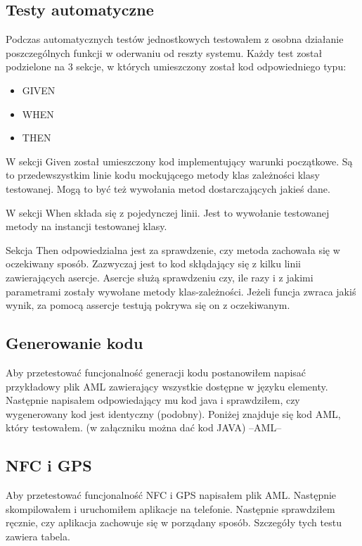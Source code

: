 \documentclass	{xmgr}
\begin{document}
\subsection{Testy automatyczne }
Podczas  automatycznych testów jednostkowych testowałem z osobna działanie poszczególnych funkcji w oderwaniu od reszty systemu. Każdy test został podzielone na 3 sekcje, w których umieszczony został kod odpowiedniego typu:
\begin{itemize}
\item GIVEN
\item WHEN
\item THEN
\end{itemize}

W sekcji Given został umieszczony kod implementujący warunki początkowe. Są to przedewszystkim linie kodu mockującego metody klas zależności klasy testowanej. Mogą to być też wywołania metod dostarczających jakieś dane. 

W sekcji When składa się z pojedynczej linii. Jest to wywołanie testowanej metody na instancji testowanej klasy.

Sekcja Then odpowiedzialna jest za sprawdzenie, czy metoda zachowała się w oczekiwany sposób. Zazwyczaj jest to kod skłądający się z kilku linii zawierających asercje. Asercje służą sprawdzeniu czy, ile razy i z jakimi parametrami zostały wywołane metody klas-zależności. Jeżeli funcja zwraca jakiś wynik, za pomocą assercje testują pokrywa się on z oczekiwanym.

\subsection{Generowanie kodu}
Aby przetestować funcjonalność generacji kodu postanowiłem napisać przykładowy plik AML zawierający wszystkie dostępne w języku elementy. Następnie napisałem odpowiedający mu kod java i sprawdziłem, czy wygenerowany kod jest identyczny (podobny).  
Poniżej znajduje się kod AML, który testowałem. (w załączniku można dać kod JAVA)
--AML--

\subsection{NFC i GPS}
Aby przetestować funcjonalność NFC i GPS napisałem plik AML. Następnie skompilowałem i uruchomiłem aplikacje na telefonie. 
Następnie sprawdziłem ręcznie, czy aplikacja zachowuje się w porządany sposób.
Szczegóły tych testu zawiera tabela.
\end{document}
